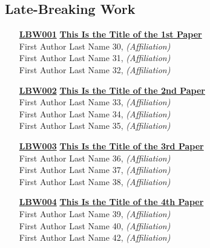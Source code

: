 \subsection{Late-Breaking Work}
\begin{enumerate}
\item[\href{https://doi.org/10.1145/1122445.1122456}{\textbf{LBW001}}]
\href{https://doi.org/10.1145/1122445.1122456}{\textbf{This Is the Title of the 1st Paper}}\\
First Author Last Name 30, \emph{(Affiliation)}\\
First Author Last Name 31, \emph{(Affiliation)}\\
First Author Last Name 32, \emph{(Affiliation)}\\

\item[\href{https://doi.org/10.1145/1122445.1122456}{\textbf{LBW002}}]
\href{https://doi.org/10.1145/1122445.1122456}{\textbf{This Is the Title of the 2nd Paper}}\\
First Author Last Name 33, \emph{(Affiliation)}\\
First Author Last Name 34, \emph{(Affiliation)}\\
First Author Last Name 35, \emph{(Affiliation)}\\

\item[\href{https://doi.org/10.1145/1122445.1122456}{\textbf{LBW003}}]
\href{https://doi.org/10.1145/1122445.1122456}{\textbf{This Is the Title of the 3rd Paper}}\\
First Author Last Name 36, \emph{(Affiliation)}\\
First Author Last Name 37, \emph{(Affiliation)}\\
First Author Last Name 38, \emph{(Affiliation)}\\

\item[\href{https://doi.org/10.1145/1122445.1122456}{\textbf{LBW004}}]
\href{https://doi.org/10.1145/1122445.1122456}{\textbf{This Is the Title of the 4th Paper}}\\
First Author Last Name 39, \emph{(Affiliation)}\\
First Author Last Name 40, \emph{(Affiliation)}\\
First Author Last Name 42, \emph{(Affiliation)}\\
\end{enumerate}


